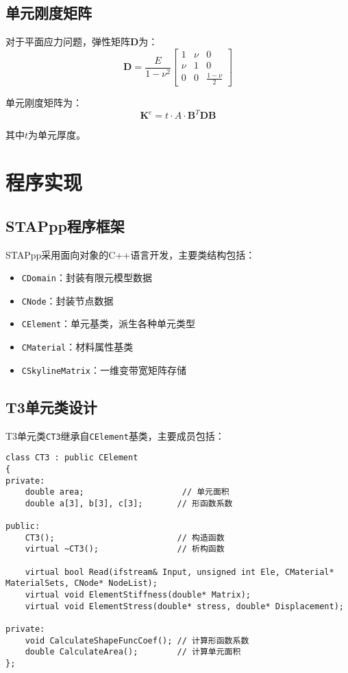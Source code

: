\documentclass[12pt,a4paper]{article}
\begin{document}
\subsection{单元刚度矩阵}

对于平面应力问题，弹性矩阵$\mathbf{D}$为：
\begin{equation}
\mathbf{D} = \frac{E}{1-\nu^2} \begin{bmatrix}
1 & \nu & 0 \\
\nu & 1 & 0 \\
0 & 0 & \frac{1-\nu}{2}
\end{bmatrix}
\end{equation}

单元刚度矩阵为：
\begin{equation}
\mathbf{K}^e = t \cdot A \cdot \mathbf{B}^T \mathbf{D} \mathbf{B}
\end{equation}

其中$t$为单元厚度。

\section{程序实现}

\subsection{STAPpp程序框架}

STAPpp采用面向对象的C++语言开发，主要类结构包括：
\begin{itemize}
    \item \texttt{CDomain}：封装有限元模型数据
    \item \texttt{CNode}：封装节点数据
    \item \texttt{CElement}：单元基类，派生各种单元类型
    \item \texttt{CMaterial}：材料属性基类
    \item \texttt{CSkylineMatrix}：一维变带宽矩阵存储
\end{itemize}

\subsection{T3单元类设计}

T3单元类\texttt{CT3}继承自\texttt{CElement}基类，主要成员包括：

\begin{lstlisting}[caption=T3单元类声明]
class CT3 : public CElement
{
private:
    double area;                    // 单元面积
    double a[3], b[3], c[3];       // 形函数系数
    
public:
    CT3();                         // 构造函数
    virtual ~CT3();                // 析构函数
    
    virtual bool Read(ifstream& Input, unsigned int Ele, CMaterial* MaterialSets, CNode* NodeList);
    virtual void ElementStiffness(double* Matrix);
    virtual void ElementStress(double* stress, double* Displacement);
    
private:
    void CalculateShapeFuncCoef(); // 计算形函数系数
    double CalculateArea();        // 计算单元面积
};
\end{lstlisting}
\end{document}
